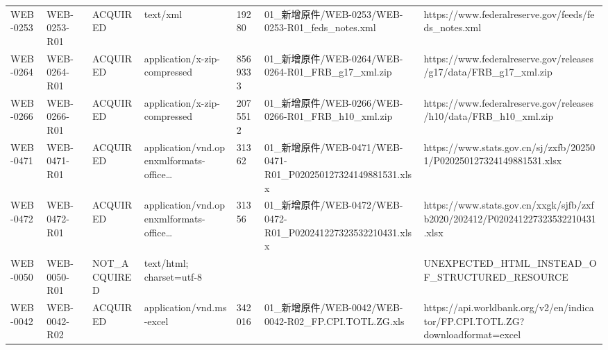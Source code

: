 \begin{landscape}
\begin{longtable}{p{1.8cm}p{1.8cm}p{2.6cm}p{3.5cm}p{2.0cm}p{5.0cm}p{6.5cm}}
WEB-0253 & WEB-0253-R01 & ACQUIRED & text/\allowbreak{}xml & 19280 & 01\_\allowbreak{}新增原件/\allowbreak{}WEB-0253/\allowbreak{}WEB-0253-R01\_\allowbreak{}feds\_\allowbreak{}notes.xml & https:/\allowbreak{}/\allowbreak{}www.federalreserve.gov/\allowbreak{}feeds/\allowbreak{}feds\_\allowbreak{}notes.xml\\
WEB-0264 & WEB-0264-R01 & ACQUIRED & application/\allowbreak{}x-zip-compressed & 8569333 & 01\_\allowbreak{}新增原件/\allowbreak{}WEB-0264/\allowbreak{}WEB-0264-R01\_\allowbreak{}FRB\_\allowbreak{}g17\_\allowbreak{}xml.zip & https:/\allowbreak{}/\allowbreak{}www.federalreserve.gov/\allowbreak{}releases/\allowbreak{}g17/\allowbreak{}data/\allowbreak{}FRB\_\allowbreak{}g17\_\allowbreak{}xml.zip\\
WEB-0266 & WEB-0266-R01 & ACQUIRED & application/\allowbreak{}x-zip-compressed & 2075512 & 01\_\allowbreak{}新增原件/\allowbreak{}WEB-0266/\allowbreak{}WEB-0266-R01\_\allowbreak{}FRB\_\allowbreak{}h10\_\allowbreak{}xml.zip & https:/\allowbreak{}/\allowbreak{}www.federalreserve.gov/\allowbreak{}releases/\allowbreak{}h10/\allowbreak{}data/\allowbreak{}FRB\_\allowbreak{}h10\_\allowbreak{}xml.zip\\
WEB-0471 & WEB-0471-R01 & ACQUIRED & application/\allowbreak{}vnd.openxmlformats-office… & 31362 & 01\_\allowbreak{}新增原件/\allowbreak{}WEB-0471/\allowbreak{}WEB-0471-R01\_\allowbreak{}P020250127324149881531.xlsx & https:/\allowbreak{}/\allowbreak{}www.stats.gov.cn/\allowbreak{}sj/\allowbreak{}zxfb/\allowbreak{}202501/\allowbreak{}P020250127324149881531.xlsx\\
WEB-0472 & WEB-0472-R01 & ACQUIRED & application/\allowbreak{}vnd.openxmlformats-office… & 31356 & 01\_\allowbreak{}新增原件/\allowbreak{}WEB-0472/\allowbreak{}WEB-0472-R01\_\allowbreak{}P020241227323532210431.xlsx & https:/\allowbreak{}/\allowbreak{}www.stats.gov.cn/\allowbreak{}xxgk/\allowbreak{}sjfb/\allowbreak{}zxfb2020/\allowbreak{}202412/\allowbreak{}P020241227323532210431.xlsx\\
WEB-0050 & WEB-0050-R01 & NOT\_\allowbreak{}ACQUIRED & text/\allowbreak{}html; charset=utf-8 &  &  & UNEXPECTED\_\allowbreak{}HTML\_\allowbreak{}INSTEAD\_\allowbreak{}OF\_\allowbreak{}STRUCTURED\_\allowbreak{}RESOURCE\\
WEB-0042 & WEB-0042-R02 & ACQUIRED & application/\allowbreak{}vnd.ms-excel & 342016 & 01\_\allowbreak{}新增原件/\allowbreak{}WEB-0042/\allowbreak{}WEB-0042-R02\_\allowbreak{}FP.CPI.TOTL.ZG.xls & https:/\allowbreak{}/\allowbreak{}api.worldbank.org/\allowbreak{}v2/\allowbreak{}en/\allowbreak{}indicator/\allowbreak{}FP.CPI.TOTL.ZG?downloadformat=excel\\

\end{longtable}
\end{landscape}
